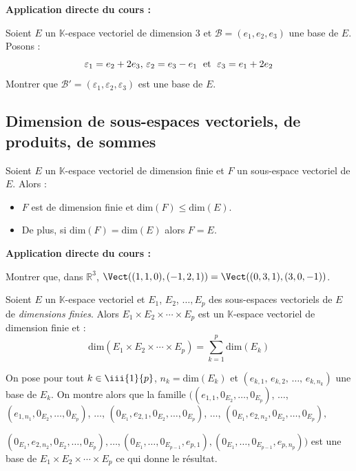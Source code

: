 \documentclass[french,11pt,twoside]{VcCours}
\newenvironment{ApplicationDirecte}{\textbf{Application directe du cours :}

}{}
\begin{document}
\begin{ApplicationDirecte} Soient $E$ un $\mathbb{K}$-espace vectoriel de dimension 3 et $\mathcal{B} = (e_{1} ,e_{2} ,e_{3})$ une base de $E$. Posons :
  \[
  \varepsilon_{1} = e_{2} + 2e_{3} , \, \varepsilon_{2} = e_{3} - e_{1} \; \hbox{ et } \; \varepsilon_{3} = e_{1} + 2e_{2}
  \]
Montrer que $\mathcal{B}' = (\varepsilon_{1} ,\varepsilon_{2} ,\varepsilon_{3})$ est une base de $E$.
\end{ApplicationDirecte}

\subsection{Dimension de sous-espaces vectoriels, de produits, de sommes}

\begin{Proposition}{}  Soient $E$ un $\mathbb{K}$-espace vectoriel de dimension finie et $F$ un sous-espace vectoriel de $E$. Alors :

\begin{itemize}
\item $F$ est de dimension finie et $\textrm{dim}(F) \leq \textrm{dim}(E)$.
\item De plus, si $\textrm{dim}(F) = \textrm{dim}(E)$ alors $F=E$.
\end{itemize}
\end{Proposition}

\begin{ApplicationDirecte} Montrer que, dans $\mathbb{R}^3$, $\Vect((1,1,0), (-1,2,1))= \Vect((0,3,1), (3,0,-1))$.
\end{ApplicationDirecte}

\begin{Proposition}{}
Soient $E$ un $\mathbb{K}$-espace vectoriel et $E_1$, $E_2$, $\ldots, E_p$ des sous-espaces vectoriels de $E$ de \emph{dimensions finies}. Alors $E_1 \times E_2 \times \cdots \times E_p$ est un $\mathbb{K}$-espace vectoriel de dimension finie et :
$$ \textrm{dim}(E_1 \times E_2 \times \cdots \times E_p) = \sum_{k=1}^p \textrm{dim} (E_k)$$
\end{Proposition}

\begin{Demonstration}{} On pose pour tout $k \in \iii{1}{p}$, 
	$n_k = \textrm{dim} (E_k)$ et $(e_{k,1}, \, e_{k,2}, \, \ldots, \, e_{k,n_k})$ 
	une base de $E_k$. On montre alors que la famille 
	$((e_{1,1}, 0_{E_2}, \ldots, 0_{E_p})$, $\ldots$, 
	$(e_{1,n_1}, 0_{E_2}, \ldots, 0_{E_p})$, $\ldots$, 
	$(0_{E_1},e_{2,1}, 0_{E_2}, \ldots, 0_{E_p})$, $\ldots$,
	$(0_{E_1},e_{2,n_2}, 0_{E_2}, \ldots,0_{E_p}),$

$(0_{E_1},e_{2,n_2}, 0_{E_2}, \ldots,0_{E_p}), \ldots, 
(0_{E_1},\ldots, 0_{E_{p-1}}, e_{p,1}), (0_{E_1},\ldots, 
0_{E_{p-1}}, e_{p,n_p}))$ est une base de $E_1 \times E_2 \times \cdots \times E_p$
ce qui donne le résultat.
\end{Demonstration}
\end{document}
